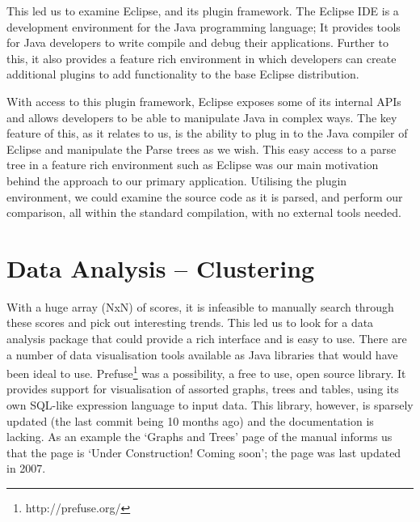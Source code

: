 This led us to examine Eclipse, and its plugin framework.
The Eclipse IDE is a development environment for the Java programming language;
It provides tools for Java developers to write compile and debug their applications.
Further to this, it also provides a feature rich environment in which developers
can create additional plugins to add functionality to the base Eclipse distribution.

With access to this plugin framework, Eclipse exposes some of its internal APIs
and allows developers to be able to manipulate Java in complex ways. The key feature
of this, as it relates to us, is the ability to plug in to the Java compiler of Eclipse
and manipulate the Parse trees as we wish. This easy access to a parse tree in a
feature rich environment such as Eclipse was our main motivation behind the approach
to our primary application. Utilising the plugin environment, we could examine the
source code as it is parsed, and perform our comparison, all within the standard
compilation, with no external tools needed.

\section{Data Analysis -- Clustering}

With a huge array (NxN) of scores, it is infeasible to manually search through
these scores and pick out interesting trends. This led us to look for a data
analysis package that could provide a rich interface and is easy to use. There
are a number of data visualisation tools available as Java libraries that would
have been ideal to use. Prefuse\footnote{http://prefuse.org/} was a possibility, a free
to use, open source library. It provides support for visualisation of assorted
graphs, trees and tables, using its own SQL-like expression language to input
data. This library, however, is sparsely updated (the last commit being 10
months ago) and the documentation is lacking. As an example the `Graphs and
Trees' page of the manual informs us that the page is `Under Construction!
Coming soon'; the page was last updated in 2007.

